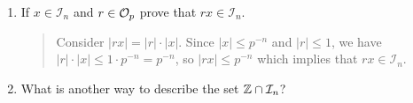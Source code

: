 \documentclass{hw}
\begin{document}
\begin{enumerate}
\begin{enumerate}
            \item If $x\in\mathcal{I}_{n}$ and $r\in\mathcal{O}_{p}$ prove that $rx\in\mathcal{I}_{n}$.
            \begin{quote}
                Consider $|rx| = |r|\cdot|x|$. Since $|x|\leq p^{-n}$ and $|r|\leq1$, we have
                $|r|\cdot|x|\leq 1\cdot p^{-n} = p^{-n}$, so $|rx|\leq p^{-n}$ which implies that
                $rx\in\mathcal{I}_{n}$.
            \end{quote}

            \item What is another way to describe the set $\mathbb{Z}\cap\mathcal{I}_{n}$?
        \end{enumerate}
    \end{enumerate}
\end{document}
